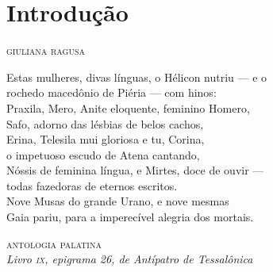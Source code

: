 \chapter*{Introdução }


\vspace*{-1cm}
\begin{flushright}
\textsc{giuliana ragusa}
\end{flushright}


{\setlength{\epigraphwidth}{.7\textwidth}
\epigraph{Estas mulheres, divas línguas, o Hélicon nutriu --- e o  \\
rochedo macedônio de Piéria --- com hinos: \\
Praxila, Mero, Anite eloquente, feminino Homero, \\
Safo, adorno das lésbias de belos cachos, \\
Erina, Telesila mui gloriosa e tu, Corina, \\
o impetuoso escudo de Atena cantando, \\
Nóssis de feminina língua, e Mirtes, doce de ouvir ---  \\
todas fazedoras de eternos escritos. \\
Nove Musas do grande Urano, e nove mesmas \\
Gaia pariu, para a imperecível alegria dos mortais.}
{\textsc{antologia palatina}\footnotemark{}\\\emph{Livro \textsc{ix}, epigrama 26, de Antípatro de Tessalônica}\footnotemark{}}
\addtocounter{footnote}{-2}
}

